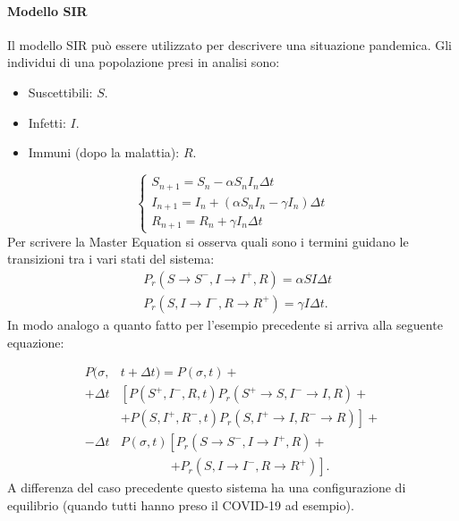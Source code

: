 \paragraph{Modello SIR}
Il modello SIR può essere utilizzato per descrivere una situazione pandemica. Gli individui di una popolazione presi in analisi sono:
\begin{itemize}
    \item Suscettibili: $S$.
    \item Infetti: $I$.
    \item Immuni (dopo la malattia): $R$.
\end{itemize}
\[
    \begin{cases}
    S_{n+1} = S_n - \alpha S_n I_n \Delta t\\
    I_{n+1} = I_n + (\alpha S_n I_n - \gamma I_n) \Delta t\\
    R_{n+1} = R_n + \gamma I_n \Delta t
    \end{cases}
\]
Per scrivere la Master Equation si osserva quali sono i termini guidano le transizioni tra i vari stati del sistema:
\[\begin{aligned}
    &P_r(S\to S^-, I \to I^+, R) = \alpha S I \Delta t\\
    &P_r(S, I \to I^-, R \to R^+) = \gamma I \Delta t
.\end{aligned}\]
In modo analogo a quanto fatto per l'esempio precedente si arriva alla seguente equazione:

\begin{align*}
    P(\sigma, &t + \Delta t) = P(\sigma, t) + \\
     + \Delta t &\left[ P(S^+, I^-, R, t) P_r(S^+\to S, I^- \to I, R) + \right.\\
		& \left.+ P(S, I^+, R^-, t) P_r(S, I^+ \to I, R^-\to R) \right] + \\
     - \Delta t & P(\sigma, t) \left[ P_r(S\to S^-, I \to I^+, R) \right. + \\
		& \qquad \qquad \left.+ P_r(S, I\to I^-, R\to R^+)\right].
\end{align*}
A differenza del caso precedente questo sistema ha una configurazione di equilibrio (quando tutti hanno preso il COVID-19 ad esempio).
